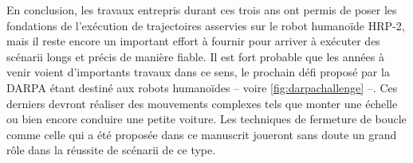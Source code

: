 En conclusion, les travaux entrepris durant ces trois ans ont permis
de poser les fondations de l'exécution de trajectoires asservies sur
le robot humanoïde HRP-2, mais il reste encore un important effort à
fournir pour arriver à exécuter des scénarii longs et précis de
manière fiable. Il est fort probable que les années à venir voient
d'importants travaux dans ce sens, le prochain défi proposé par la
DARPA \citep{darpa_challenge} étant destiné aux robots humanoïdes --
voire \autoref{fig:darpachallenge} --. Ces derniers devront réaliser
des mouvements complexes tels que monter une échelle ou bien encore
conduire une petite voiture. Les techniques de fermeture de boucle
comme celle qui a été proposée dans ce manuscrit joueront sans doute
un grand rôle dans la réussite de scénarii de ce type.
